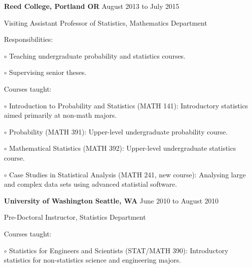 \documentclass[10pt]{article}
\newcommand{\halfblankline}{\quad\vspace{-0.5\baselineskip}\pagebreak[3]}
\begin{document}
\textbf{Reed College, Portland OR} \hfill {August 2013 to July 2015}
\begin{outerlist}
    \item[] Visiting Assistant Professor of Statistics, Mathematics Department
    \begin{innerlist}
        \item Responsibilities:
		\begin{innerlist}
		\item[$\circ$] Teaching undergraduate probability and statistics courses.
		\item[$\circ$] Supervising senior theses.
		\end{innerlist}
		\item Courses taught:
		\begin{innerlist}
		\item[$\circ$] Introduction to Probability and Statistics (MATH 141):  Introductory
		statistics aimed primarily at non-math majors.
		\item[$\circ$] Probability (MATH 391): Upper-level undergraduate probability course.
		\item[$\circ$] Mathematical Statistics (MATH 392): Upper-level undergraduate statistics course.
		\item[$\circ$] Case Studies in Statistical Analysis (MATH 241, new course):  Analysing large and complex data sets using advanced statistial software.
	\end{innerlist}
    \end{innerlist}
\end{outerlist}

\halfblankline

\textbf{University of Washington Seattle, WA} \hfill {June 2010 to August 2010}
\begin{outerlist}
    \item[] Pre-Doctoral Instructor, Statistics Department
    \begin{innerlist}
		\item Courses taught:
		\begin{innerlist}
		\item[$\circ$] Statistics for Engineers and Scientists (STAT/MATH 390):
		Introductory statistics for non-statistics science and engineering majors.
		\end{innerlist}
    \end{innerlist}
\end{outerlist}
\end{document}
